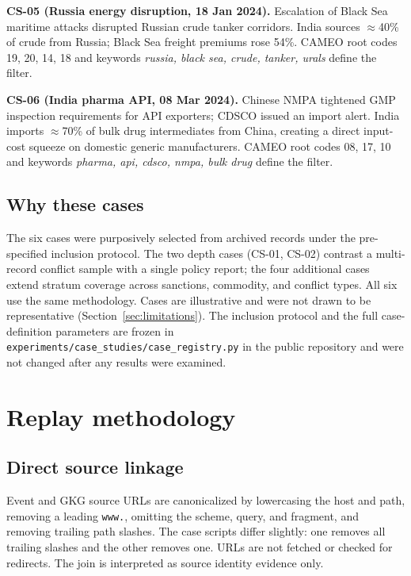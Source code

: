 \documentclass[10pt,a4paper,twocolumn]{article}
\begin{document}
\textbf{CS-05 (Russia energy disruption, 18 Jan 2024).}
Escalation of Black Sea maritime attacks disrupted Russian crude tanker corridors. India sources $\approx$40\% of crude from Russia; Black Sea freight premiums rose 54\%. CAMEO root codes 19, 20, 14, 18 and keywords \textit{russia, black sea, crude, tanker, urals} define the filter.

\textbf{CS-06 (India pharma API, 08 Mar 2024).}
Chinese NMPA tightened GMP inspection requirements for API exporters; CDSCO issued an import alert. India imports $\approx$70\% of bulk drug intermediates from China, creating a direct input-cost squeeze on domestic generic manufacturers. CAMEO root codes 08, 17, 10 and keywords \textit{pharma, api, cdsco, nmpa, bulk drug} define the filter.

\subsection{Why these cases}\label{sec:whycases}

The six cases were purposively selected from archived records under the pre-specified inclusion protocol. The two depth cases (CS-01, CS-02) contrast a multi-record conflict sample with a single policy report; the four additional cases extend stratum coverage across sanctions, commodity, and conflict types. All six use the same methodology. Cases are illustrative and were not drawn to be representative (Section~\ref{sec:limitations}). The inclusion protocol and the full case-definition parameters are frozen in \texttt{experiments/case\_studies/case\_registry.py} in the public repository and were not changed after any results were examined.

\section{Replay methodology}\label{sec:methods}

\subsection{Direct source linkage}

Event and GKG source URLs are canonicalized by lowercasing the host and path, removing a leading \texttt{www.}, omitting the scheme, query, and fragment, and removing trailing path slashes. The case scripts differ slightly: one removes all trailing slashes and the other removes one. URLs are not fetched or checked for redirects. The join is interpreted as source identity evidence only.
\end{document}
